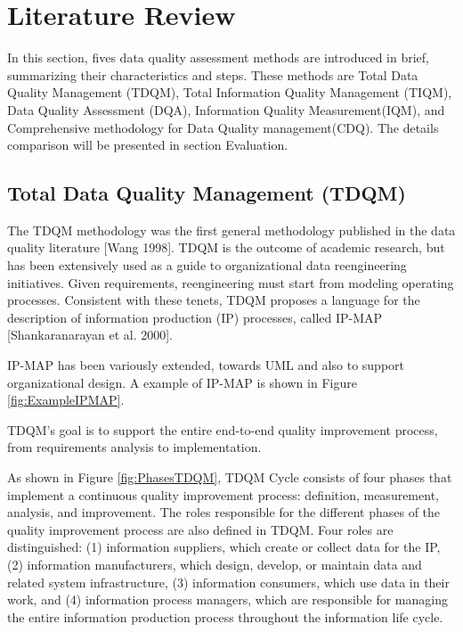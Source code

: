 \documentclass[pdftex,english,oribibl]{llncs}
\begin{document}
\section{Literature Review}
In this section, fives data quality assessment methods are introduced in brief, summarizing their characteristics and steps. These methods are Total Data Quality Management (TDQM), Total Information Quality Management (TIQM), Data Quality Assessment (DQA), Information Quality Measurement(IQM), and Comprehensive methodology for Data Quality management(CDQ). The details comparison will be presented in section Evaluation.

\subsection{Total Data Quality Management (TDQM)}

The TDQM methodology was the first general methodology published in the data quality literature [Wang 1998]. TDQM is the outcome of academic research, but has been extensively used as a guide to organizational data reengineering initiatives.
Given requirements, reengineering must start from modeling operating processes. Consistent with these tenets, TDQM proposes a language for the description of information production (IP) processes, called IP-MAP [Shankaranarayan et al. 2000].
\begin{comment}
IP-MAP is the only language for information process modeling and represents a de facto standard. Practical experiences with TDQM are reported, for example, in Kovac and Weickert [2002].
\end{comment}
IP-MAP has been variously extended, towards UML and also to support organizational design.  A example of IP-MAP is shown in Figure \ref{fig:ExampleIPMAP}.

TDQM's goal is to support the entire end-to-end quality improvement process, from requirements analysis to implementation.

As shown in Figure \ref{fig:PhasesTDQM}, TDQM Cycle consists of four phases that implement a continuous quality improvement process: definition, measurement, analysis, and improvement.
The roles responsible for the different phases of the quality improvement process are also defined in TDQM.
Four roles are distinguished: (1) information suppliers, which create or collect data for the IP, (2) information manufacturers, which design, develop, or maintain data and related system infrastructure, (3) information consumers, which use data in their work, and  (4) information process managers, which are responsible for managing the entire information production process throughout the information life cycle.
\end{document}
